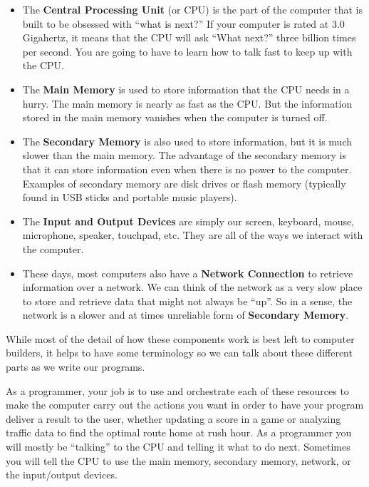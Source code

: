 \begin{itemize}

\item The {\bf Central Processing Unit} (or CPU) is 
the part of the computer that is built to be obsessed 
with ``what is next?''  If your computer is rated
at 3.0 Gigahertz, it means that the CPU will ask ``What next?''
three billion times per second.  You are going to have to 
learn how to talk fast to keep up with the CPU.

\item The {\bf Main Memory} is used to store information
that the CPU needs in a hurry.  The main memory is nearly as 
fast as the CPU.  But the information stored in the main
memory vanishes when the computer is turned off.

\item The {\bf Secondary Memory} is also used to store
information, but it is much slower than the main memory.
The advantage of the secondary memory is that it can
store information even when there is no power to the
computer.  Examples of secondary memory are disk drives
or flash memory (typically found in USB sticks and portable
music players).

\item The {\bf Input and Output Devices} are simply our
screen, keyboard, mouse, microphone, speaker, touchpad, etc.  
They are all of the ways we interact with the computer.

\item These days, most computers also have a
{\bf Network Connection} to retrieve information over a network.
We can think of the network as a very slow place to store and
retrieve data that might not always be ``up''.  So in a sense,
the network is a slower and at times unreliable form of
{\bf Secondary Memory}.

\end{itemize}

While most of the detail of how these components work is best left 
to computer builders, it helps to have some terminology
so we can talk about these different parts as we write our programs.

As a programmer, your job is to use and orchestrate 
each of these resources to make the computer carry out the
actions you want in order to have your program deliver
a result to the user, whether updating a score in a game
or analyzing traffic data to find the optimal route home at
rush hour.  As a programmer you will 
mostly be ``talking'' to the CPU and telling it what to 
do next.  Sometimes you will tell the CPU to use the main memory,
secondary memory, network, or the input/output devices.


